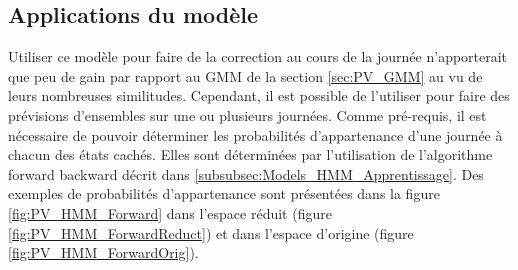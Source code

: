 \documentclass[12pt]{report}
\begin{document}

\subsection{Applications du modèle}

Utiliser ce modèle pour faire de la correction au cours de la journée n'apporterait que peu de gain par rapport au GMM de la section \ref{sec:PV_GMM} au vu de leurs nombreuses similitudes. Cependant, il est possible de l'utiliser pour faire des prévisions d'ensembles sur une ou plusieurs journées. Comme pré-requis, il est nécessaire de pouvoir déterminer les probabilités d'appartenance d'une journée à chacun des états cachés. Elles sont déterminées par l'utilisation de l'algorithme forward backward décrit dans \ref{subsubsec:Models_HMM_Apprentissage}. Des exemples de probabilités d'appartenance sont présentées dans la figure \ref{fig:PV_HMM_Forward} dans l'espace réduit (figure \ref{fig:PV_HMM_ForwardReduct}) et dans l'espace d'origine (figure \ref{fig:PV_HMM_ForwardOrig}).
\end{document}
